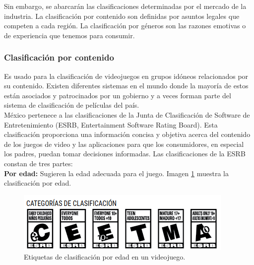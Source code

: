 Sin embargo, se abarcarán las clasificaciones determinadas por el mercado de la industria. La clasificación por contenido son definidas por asuntos legales que competen a cada región. La clasificación por géneros son las razones emotivas o de experiencia que tenemos para consumir.
\\[1pt]

\subsubsection{Clasificación por contenido}
	Es usado para la clasificación de videojuegos en grupos idóneos relacionados por su contenido. Existen diferentes sistemas en el mundo donde la mayoría de estos están asociados y patrocinados por un gobierno y a veces forman parte del sistema de clasificación de películas del país.\\[1pt]	
	
	México pertenece a las clasificaciones de la Junta de Clasificación de Software de Entretenimiento (ESRB, Entertainment Software Rating Board)\cite{vid02}. Esta clasificación proporciona una información concisa y objetiva acerca del contenido de los juegos de video y las aplicaciones para que los consumidores, en especial los padres, puedan tomar decisiones informadas. Las clasificaciones de la ESRB constan de tres partes:\\[1pt]
			
\textbf{Por edad: }
Sugieren la edad adecuada para el juego. Imagen \ref{fig:clasEti} muestra la clasificación por edad.	
\\[1pt]

	\begin{figure}
	\centering
	\includegraphics[width=\textwidth]{03MarcoTeorico/imageR/clasEti}
	\caption{Etiquetas de clasificación por edad en un videojuego.}
	\label{fig:clasEti}
\end{figure}


